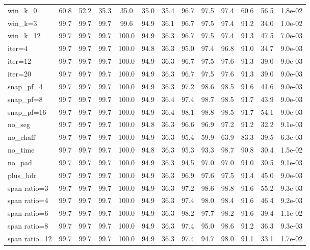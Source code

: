 \begin{tabular}{@{}lcccccccccccc@{}}
win\_k{=}0 & 60.8 & 52.2 & 35.3 & 35.0 & 35.0 & 35.4 & 96.7 & 97.5 & 97.4 & 60.6 & 56.5 & 1.8e-02 \\
win\_k{=}3 & 99.7 & 99.7 & 99.7 & 99.6 & 94.9 & 36.1 & 96.7 & 97.5 & 97.4 & 91.2 & 34.0 & 1.0e-02 \\
win\_k{=}12 & 99.7 & 99.7 & 99.7 & 100.0 & 94.9 & 36.3 & 96.7 & 97.5 & 97.4 & 91.3 & 47.5 & 7.0e-03 \\
iter{=}4 & 99.7 & 99.7 & 99.7 & 100.0 & 94.8 & 36.3 & 95.0 & 97.4 & 96.8 & 91.0 & 34.7 & 9.0e-03 \\
iter{=}12 & 99.7 & 99.7 & 99.7 & 100.0 & 94.9 & 36.3 & 96.7 & 97.5 & 97.6 & 91.3 & 39.0 & 9.0e-03 \\
iter{=}20 & 99.7 & 99.7 & 99.7 & 100.0 & 94.9 & 36.3 & 96.7 & 97.5 & 97.6 & 91.3 & 39.0 & 9.0e-03 \\
snap\_pf{=}4 & 99.7 & 99.7 & 99.7 & 100.0 & 94.9 & 36.3 & 97.2 & 98.6 & 98.5 & 91.6 & 41.6 & 9.0e-03 \\
snap\_pf{=}8 & 99.7 & 99.7 & 99.7 & 100.0 & 94.9 & 36.4 & 97.4 & 98.7 & 98.5 & 91.7 & 43.9 & 9.0e-03 \\
snap\_pf{=}16 & 99.7 & 99.7 & 99.7 & 100.0 & 94.9 & 36.4 & 98.1 & 98.8 & 98.5 & 91.7 & 54.1 & 9.0e-03 \\
no\_seg & 99.7 & 99.7 & 99.7 & 100.0 & 94.8 & 36.3 & 96.6 & 96.9 & 97.2 & 91.2 & 32.2 & 9.1e-03 \\
no\_chaff & 99.7 & 99.7 & 99.7 & 100.0 & 94.9 & 36.3 & 95.4 & 59.9 & 63.9 & 83.3 & 39.5 & 6.3e-03 \\
no\_time & 99.7 & 99.7 & 99.7 & 100.0 & 94.8 & 36.3 & 95.3 & 93.3 & 98.7 & 90.8 & 30.4 & 1.5e-02 \\
no\_pad & 99.7 & 99.7 & 99.7 & 100.0 & 94.9 & 36.3 & 94.5 & 97.0 & 97.0 & 91.0 & 30.5 & 9.1e-03 \\
plus\_hdr & 99.7 & 99.7 & 99.7 & 100.0 & 94.9 & 36.3 & 96.9 & 97.6 & 97.5 & 91.4 & 45.0 & 9.0e-03 \\
span ratio{=}3 & 99.7 & 99.7 & 99.7 & 100.0 & 94.9 & 36.3 & 97.2 & 98.6 & 98.8 & 91.6 & 55.2 & 9.3e-03 \\
span ratio{=}4 & 99.7 & 99.7 & 99.7 & 100.0 & 94.9 & 36.3 & 97.4 & 98.0 & 98.4 & 91.6 & 46.4 & 9.2e-03 \\
span ratio{=}6 & 99.7 & 99.7 & 99.7 & 100.0 & 94.9 & 36.3 & 98.2 & 97.7 & 98.2 & 91.6 & 39.4 & 1.1e-02 \\
span ratio{=}8 & 99.7 & 99.7 & 99.7 & 100.0 & 94.9 & 36.3 & 97.4 & 95.0 & 98.6 & 91.2 & 36.3 & 9.3e-03 \\
span ratio{=}12 & 99.7 & 99.7 & 99.7 & 100.0 & 94.9 & 36.3 & 97.4 & 94.7 & 98.0 & 91.1 & 33.1 & 1.7e-02 \\

\end{tabular}
